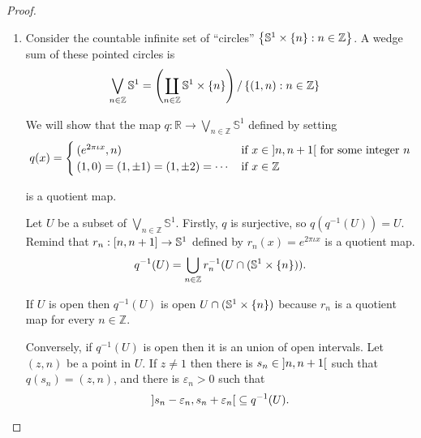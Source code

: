 \begin{proof}
    \begin{enumerate}[label={(\alph*)}]
        \item Consider the countable infinite set of ``circles'' $\left\{{\mathbb{S}^{1}\times\left\{{n}\right\} : n\in \mathbb{Z}}\right\}$. A wedge sum of these pointed circles is
              \begin{align*}
                  \bigvee_{n\in \mathbb{Z}}\mathbb{S}^{1} & = \left(\coprod_{n\in \mathbb{Z}} \mathbb{S}^{1}\times \left\{{n}\right\}\right) / \left\{{(1, n) : n\in \mathbb{Z}}\right\}
              \end{align*}

              We will show that the map $q: \mathbb{R} \to \bigvee_{n\in \mathbb{Z}}\mathbb{S}^{1}$ defined by setting
              \begin{align*}
                  q(x) = \begin{cases}
                             (e^{2\pi\iota x}, n)                      & \text{if $x \in \left]{n, n+1}\right[$ for some integer $n$} \\
                             (1, 0) = (1, \pm 1) = (1, \pm 2) = \cdots & \text{if $x \in \mathbb{Z}$}
                         \end{cases}
              \end{align*}

              is a quotient map.

              Let $U$ be a subset of $\bigvee_{n\in \mathbb{Z}}\mathbb{S}^{1}$. Firstly, $q$ is surjective, so $q(q^{-1}(U)) = U$. Remind that $r_{n}: \left[{n, n+1}\right]\to \mathbb{S}^{1}$ defined by $r_{n}(x) = e^{2\pi\iota x}$ is a quotient map.
              \begin{equation*}
                  q^{-1}(U) = \bigcup_{n\in\mathbb{Z}}r_{n}^{-1}(U \cap (\mathbb{S}^{1}\times\left\{{n}\right\})).
              \end{equation*}

              If $U$ is open then $q^{-1}(U)$ is open $U \cap (\mathbb{S}^{1}\times\left\{{n}\right\})$ because $r_{n}$ is a quotient map for every $n\in\mathbb{Z}$.

              Conversely, if $q^{-1}(U)$ is open then it is an union of open intervals. Let $(z, n)$ be a point in $U$. If $z\ne 1$ then there is $s_{n} \in \left]{n, n+1}\right[$ such that $q(s_{n}) = (z, n)$, and there is $\varepsilon_{n} > 0$ such that
              \begin{equation*}
                  \left]{s_{n} - \varepsilon_{n}, s_{n} + \varepsilon_{n}}\right[ \subseteq q^{-1}(U).
              \end{equation*}


\end{enumerate}
\end{proof}
